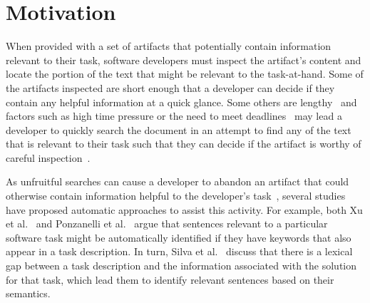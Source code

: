 \section{Motivation}
\label{cp5:motivation}


When provided with a set of artifacts that potentially contain information relevant to their task,
software developers must inspect the artifact's content and locate the portion of the text that might be relevant to the task-at-hand. 
Some of the artifacts inspected are short enough that a developer can decide if they contain any helpful information at a quick glance.
Some others are lengthy~\cite{Rastkar2013t} and factors such
as high time pressure or
the need to meet deadlines~\cite{meyer2019}
may lead a developer to quickly search the document
in an attempt to find any of the text that is relevant to their task
such that they can 
decide if the artifact is worthy of careful inspection~\cite{Starke2009}.




As unfruitful searches can 
cause a developer to abandon an artifact that could otherwise contain information  helpful to the developer's task~\cite{Brandt2009a, Starke2009},
several studies have proposed automatic approaches to assist this activity. 
For example, both Xu et al.~\cite{Xu2017} and Ponzanelli et al.~\cite{Ponzanelli2015}
argue that sentences relevant to a particular software task might be automatically identified if they have keywords that also appear in a task description.
In turn, Silva et al.~\cite{silva2019} discuss that 
there is a lexical gap between a task description and the information associated 
with the solution for that task, which lead them to identify
relevant sentences based on their semantics.










